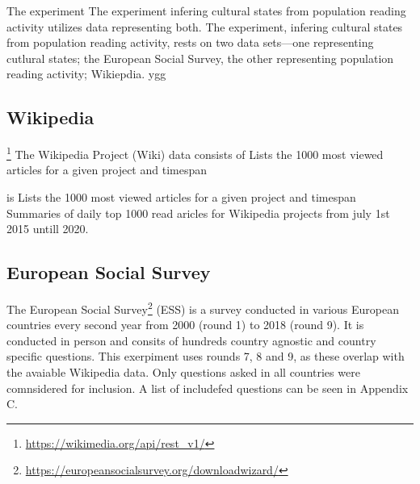The experiment 
The experiment infering cultural states from population reading activity utilizes data representing both. The experiment, infering cultural states from population reading activity, rests on two data sets—one representing cutlural states; the European Social Survey, the other representing population reading activity; Wikiepdia.
ygg


\subsection*{Wikipedia}

\footnote{\url{https://wikimedia.org/api/rest_v1/}}
The Wikipedia Project (Wiki) data consists of Lists the 1000 most viewed articles for a given project and timespan



is Lists the 1000 most viewed articles for a given project and timespan
Summaries of daily top 1000 read aricles for Wikipedia projects from july 1st 2015 untill 2020.

\subsection*{European Social Survey}

The European Social Survey\footnote{\url{https://europeansocialsurvey.org/downloadwizard/}} (ESS) is a survey conducted in various European countries every second year from 2000 (round 1) to 2018 (round 9). It is conducted in person and consits of hundreds country agnostic and country specific questions. This exerpiment uses rounds 7, 8 and 9, as these overlap with the avaiable Wikipedia data.
Only questions asked in all countries were comnsidered for inclusion. A list of includefed questions can be seen in Appendix C.

